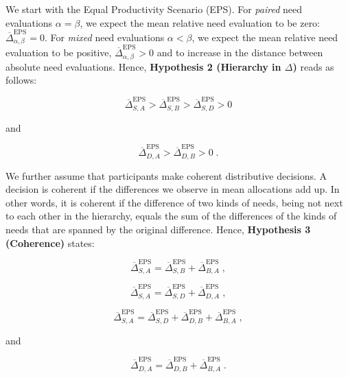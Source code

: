 \documentclass[10pt,letterpaper]{article}
\begin{document}
We start with the Equal Productivity Scenario (EPS).
For \textit{paired} need evaluations $\alpha=\beta$, we expect the mean relative need evaluation to be zero: $\overline{\Delta}^\text{EPS}_{\alpha,\beta}=0$.
For \textit{mixed} need evaluations $\alpha<\beta$, we expect the mean relative need evaluation to be positive, $\overline{\Delta}^\text{EPS}_{\alpha,\beta}>0$ and to increase in the distance between absolute need evaluations.
Hence, \textbf{Hypothesis 2 (Hierarchy in $\Delta$)} reads as follows:

\begin{equation}
   \overline{\Delta}^\text{EPS}_{S,A}>\overline{\Delta}^\text{EPS}_{S,B}>\overline{\Delta}^\text{EPS}_{S,D}>0
\end{equation}

\noindent and

\begin{equation}
   \overline{\Delta}^\text{EPS}_{D,A}>\overline{\Delta}^\text{EPS}_{D,B}>0\;.
\end{equation}

We further assume that participants make coherent distributive decisions.
A decision is coherent if the differences we observe in mean allocations add up.
In other words, it is coherent if the difference of two kinds of needs, being not next to each other in the hierarchy, equals the sum of the differences of the kinds of needs that are spanned by the original difference.
Hence, \textbf{Hypothesis 3 (Coherence)} states:

\begin{equation}
   \overline{\Delta}^\text{EPS}_{S,A}=\overline{\Delta}^\text{EPS}_{S,B}+\overline{\Delta}^\text{EPS}_{B,A}\;,
\end{equation}

\begin{equation}
   \overline{\Delta}^\text{EPS}_{S,A}=\overline{\Delta}^\text{EPS}_{S,D}+\overline{\Delta}^\text{EPS}_{D,A}\;,
\end{equation}

\begin{equation}
   \overline{\Delta}^\text{EPS}_{S,A}=\overline{\Delta}^\text{EPS}_{S,D}+\overline{\Delta}^\text{EPS}_{D,B}+\overline{\Delta}^\text{EPS}_{B,A}\;,
\end{equation}

\noindent and

\begin{equation}
	\overline{\Delta}^\text{EPS}_{D,A}=\overline{\Delta}^\text{EPS}_{D,B}+\overline{\Delta}^\text{EPS}_{B,A}\;.
\end{equation}
\end{document}
